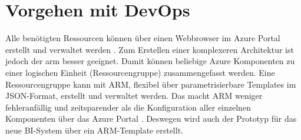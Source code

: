 \section{Vorgehen mit DevOps} \label{sec:intro:azDevOps}


Alle benötigten Ressourcen können über einen Webbrowser im Azure Portal erstellt und verwaltet werden \cite{chilberto_building_2020}. Zum Erstellen einer komplexeren Architektur ist jedoch der \ac{arm} besser geeignet. Damit können beliebige Azure Komponenten zu einer logischen Einheit (Ressourcengruppe) zusammengefasst werden. Eine Ressourcengruppe kann mit ARM, flexibel über parametrisierbare Templates im JSON-Format, erstellt und verwaltet werden. Das macht ARM weniger fehleranfällig und zeitsparender als die Konfiguration aller einzelnen Komponenten über das Azure Portal \cite{monadjemi_azure-administration_2017}. Deswegen wird auch der Prototyp für das neue BI-System über ein ARM-Template erstellt.